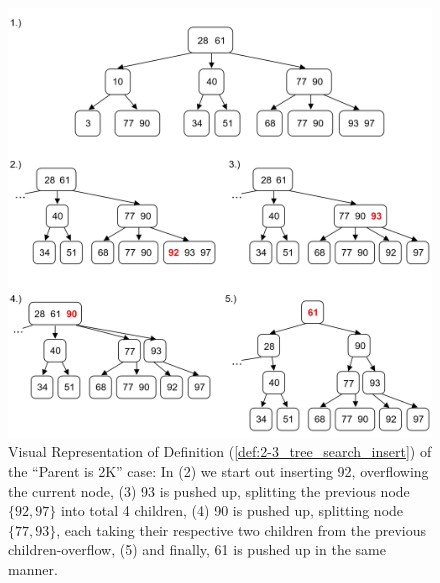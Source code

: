 \begin{figure}[ht!]
    \begin{center}
    \includegraphics[width=\textwidth]{./Sections/graphs/search/2_3_insert_complex.png}
    \end{center}
     \caption{Visual Representation of Definition (\ref{def:2-3_tree_search_insert}) of the ``Parent is 2K'' case: In (2) we start out inserting 92, overflowing the current node,
     (3) 93 is pushed up, splitting the previous node $\{92,97\}$ into total 4 children, 
     (4) 90 is pushed up, splitting node $\{77, 93\}$, each taking their respective two children from the previous children-overflow, (5) and 
     finally, 61 is pushed up in the same manner.
     }\label{fig:2-3_tree_insert_complex}
  \end{figure}
\newpage